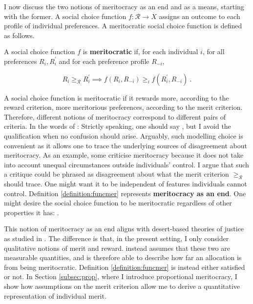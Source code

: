 I now discuss the two notions of meritocracy as an end and as a means, starting with the former. A social choice function \( f \colon \mathcal{R} \rightarrow X \) assigns an outcome to each profile of individual preferences. A meritocratic social choice function is defined as follows.

\begin{definition}\label{definition:funcmer}
	A social choice function \( f \) is \textbf{meritocratic} if, for each individual \( i \), for all preferences \( R_i, R_i^{\prime} \) and for each preference profile \( R_{-i} \),

	\[ R_i \geq_{\mathcal{R}} R^{\prime}_i \implies f ( R_i, R_{-i} ) \geq_i f ( R_i^{\prime}, R_{-i} ) \: .\]
\end{definition}

A social choice function is meritocratic if it rewards more, according to the reward criterion, more meritorious preferences, according to the merit criterion. Therefore, different notions of meritocracy correspond to different pairs of criteria. In the words of \cite{senMeritJustice2000}:  Strictly speaking, one should say , but I avoid the qualification when no confusion should arise. Arguably, such modelling choice is convenient as it allows one to trace the underlying sources of disagreement about meritocracy. As an example, some criticise meritocracy because it does not take into account unequal circumstances outside individuals' control. I argue that such a critique could be phrased as disagreement about what the merit criterion \( \geq_{\mathcal{R}} \) should trace. One might want it to be independent of features individuals cannot control. Definition \ref{definition:funcmer} represents \textbf{meritocracy as an end}. One might desire the social choice function to be meritocratic regardless of other properties it has:  \citep[p. 2]{sep-meritocracy}.

This notion of meritocracy as an end aligns with desert-based theories of justice as studied in \cite{kaganGeometryDesert2014}. The difference is that, in the present setting, I only consider qualitative notions of merit and reward. \cite{kaganGeometryDesert2014} instead assumes that these two are measurable quantities, and is therefore able to describe how far an allocation is from being meritocratic. Definition \ref{definition:funcmer} is instead either satisfied or not. In Section \ref{subsec:prop}, where I introduce proportional meritocracy, I show how assumptions on the merit criterion allow me to derive a quantitative representation of individual merit.

